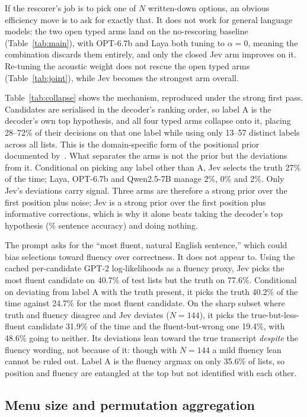 \documentclass[11pt]{article}
\begin{document}
If the rescorer's job is to pick one of $N$ written-down options, an obvious efficiency
move is to ask for exactly that. It does not work for general language models: the two
open typed arms land on the no-rescoring baseline (Table~\ref{tab:main}), with OPT-6.7b
and Laya both tuning to $\alpha=0$, meaning the combination discards them entirely, and
only the closed Jev arm improves on it. Re-tuning the acoustic weight does not rescue the
open typed arms (Table~\ref{tab:joint}), while Jev becomes the strongest arm overall.

Table~\ref{tab:collapse} shows the mechanism, reproduced under the strong first pass.
Candidates are serialised in the decoder's ranking order, so label A is the decoder's own
top hypothesis, and all four typed arms collapse onto it, placing 28--72\% of their
decisions on that one label while using only 13--57 distinct labels across all lists. This
is the domain-specific form of the positional prior documented
by~\cite{tang2023psc,bito2026position}. What separates the arms is not the prior but the
deviations from it. Conditional on picking any label other than A, Jev selects the truth
27\% of the time; Laya, OPT-6.7b and Qwen2.5-7B manage 2\%, 0\% and 2\%. Only Jev's
deviations carry signal. Three arms are therefore a strong
prior over the first position plus noise; Jev is a strong prior over the first position
plus informative corrections, which is why it alone beats taking the decoder's top
hypothesis (\firstPassTopOne\% sentence accuracy) and doing nothing.

The prompt asks for the ``most fluent, natural English sentence,'' which could bias
selections toward fluency over correctness. It does not appear to. Using the cached per-candidate GPT-2 log-likelihoods as a fluency
proxy, Jev picks the most fluent candidate on 40.7\% of test lists but the truth on
77.6\%. Conditional on deviating from label A with the truth present, it picks the truth
40.2\% of the time against 24.7\% for the most fluent candidate. On the sharp subset
where truth and fluency disagree and Jev deviates ($N=144$), it picks the
true-but-less-fluent candidate 31.9\% of the time and the fluent-but-wrong one 19.4\%,
with 48.6\% going to neither. Its deviations lean
toward the true transcript \emph{despite} the fluency wording, not because of it:
though with $N=144$ a mild fluency lean cannot be ruled out. Label A is the fluency
argmax on only 35.6\% of lists, so position and fluency are entangled at the top but
not identified with each other.

\subsection{Menu size and permutation aggregation}
\label{sec:ablation}
\end{document}
